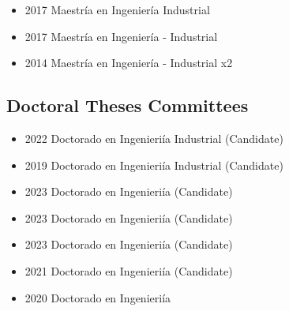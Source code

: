 
{\begin{itemize}
    \item 2017 Maestr\'ia en Ingenier\'ia Industrial
\end{itemize}
}

{\begin{itemize}
    \item 2017 Maestr\'ia en Ingenier\'ia - Industrial
\end{itemize}
}

{\begin{itemize}
    \item 2014 Maestr\'ia en Ingenier\'ia - Industrial x2
\end{itemize}
}

\clearpage

\subsection{Doctoral Theses Committees}

{\begin{itemize}
    \item 2022 Doctorado en Ingenieri\'ia Industrial (Candidate)
    \item 2019 Doctorado en Ingenieri\'ia Industrial (Candidate)
\end{itemize}
}

{\begin{itemize}
    \item 2023 Doctorado en Ingenieri\'ia (Candidate)
\end{itemize}
}

{\begin{itemize}
    \item 2023 Doctorado en Ingenieri\'ia (Candidate)
\end{itemize}
}

{\begin{itemize}
    \item 2023 Doctorado en Ingenieri\'ia (Candidate)
    \item 2021 Doctorado en Ingenieri\'ia (Candidate)
    \item 2020 Doctorado en Ingenieri\'ia
\end{itemize}
}

